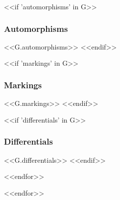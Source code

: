 \documentclass[a4paper]{article}
\begin{document}
<<if 'automorphisms' in G>>
\subsubsection{Automorphisms}
<<G.automorphisms>>
<<endif>>

<<if 'markings' in G>>
\subsubsection{Markings}
<<G.markings>>
<<endif>>

<<if 'differentials' in G>>
\subsubsection{Differentials}
<<G.differentials>>
<<endif>>

<<endfor>>%


<<endfor>>%
\end{document}
